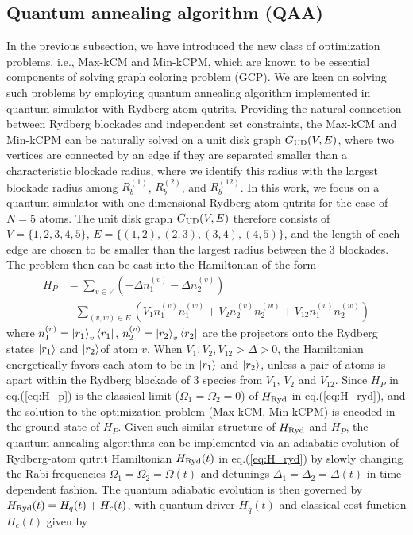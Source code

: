 \documentclass[%
 reprint,
nofootinbib,
 amsmath,amssymb,
 aps,
floatfix,
]{revtex4-2}
\begin{document}
\subsection{Quantum annealing algorithm (QAA)}

In the previous subsection, we have introduced the new class of optimization problems, i.e., Max-kCM and Min-kCPM, which are known to be essential components of solving graph coloring problem (GCP). We are keen on solving such problems by employing quantum annealing algorithm implemented in quantum simulator with Rydberg-atom qutrits. Providing the natural connection between Rydberg blockades and independent set constraints, the Max-kCM and Min-kCPM can be naturally solved on a unit disk graph $G_{\rm UD}(V,E)$, where two vertices are connected by an edge if they are separated smaller than a characteristic blockade radius, where we identify this radius with the largest blockade radius among $R^{(1)}_b$, $R^{(2)}_b$, and $R^{(12)}_b$. In this work, we focus on a quantum simulator with one-dimensional Rydberg-atom qutrits for the case of $N=5$ atoms. The unit disk graph $G_{\rm UD}(V,E)$ therefore consists of $V=\{1,2,3,4,5\}$, $E=\{(1,2),(2,3),(3,4),(4,5)\}$, and the length of each edge are chosen to be smaller than the largest radius between the 3 blockades. The problem then can be cast into the Hamiltonian of the form 
\begin{align}\label{eq:H_p}
H_{P}  &= \sum_{v \in V} (- \Delta n^{(v)}_1  - \Delta n^{(v)}_2) \nonumber \\ 
&+ \sum_{(v,w) \in E} (V_1 n^{(v)}_1 n^{(w)}_1  + V_2 n^{(v)}_2 n^{(w)}_2 + V_{12} n^{(v)}_1 n^{(w)}_2)
\end{align}
where $n^{(v)}_1 = \ket{r_1}_v \bra{r_1}$, $n^{(v)}_2 = \ket{r_2}_v \bra{r_2}$ are the projectors onto the Rydberg states $\ket{r_1}$ and $\ket{r_2}$of atom $v$. When $ V_1, V_2, V_{12} > \Delta > 0$, the Hamiltonian energetically favors each atom to be in $\ket{r_1}$ and $\ket{r_2}$, unless a pair of atoms is apart within the Rydberg blockade of 3 species from $V_1$, $V_2$ and $V_{12}$. Since $H_P$ in eq.(\ref{eq:H_p}) is the classical limit ($\Omega_1 = \Omega_2 =0$) of $H_{\rm Ryd}$ in eq.(\ref{eq:H_ryd}), and the solution to the optimization problem (Max-kCM, Min-kCPM) is encoded in the ground state of $H_P$. Given such similar structure of $H_{\rm Ryd}$ and $H_P$, the quantum annealing algorithms can be implemented via an adiabatic evolution of Rydberg-atom qutrit Hamiltonian $H_{\rm Ryd}(t)$ in eq.(\ref{eq:H_ryd}) by slowly changing the Rabi frequencies $\Omega_1 = \Omega_2 = \Omega(t)$ and detunings $\Delta_1 = \Delta_2 = \Delta(t)$ in time-dependent fashion. The quantum adiabatic evolution is then governed by $H_{\rm Ryd}(t) = H_q(t) + H_c(t)$, with quantum driver $H_q(t)$ and classical cost function $H_c(t)$ given by
\end{document}
